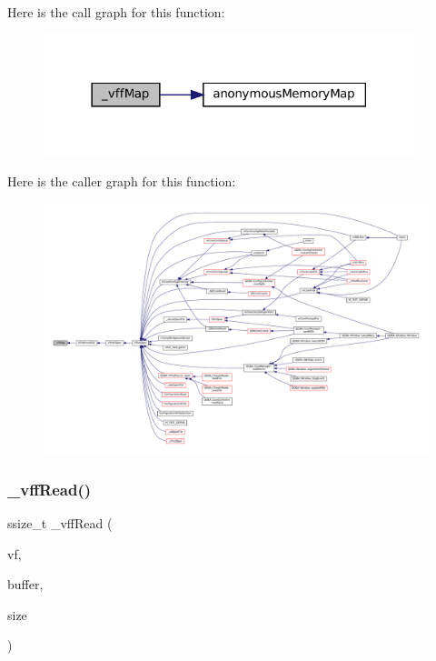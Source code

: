 Here is the call graph for this function\+:
\nopagebreak
\begin{figure}[H]
\begin{center}
\leavevmode
\includegraphics[width=306pt]{vfs-file_8c_ae264af80ce9f8d7e855924166bbe3866_cgraph}
\end{center}
\end{figure}
Here is the caller graph for this function\+:
\nopagebreak
\begin{figure}[H]
\begin{center}
\leavevmode
\includegraphics[width=350pt]{vfs-file_8c_ae264af80ce9f8d7e855924166bbe3866_icgraph}
\end{center}
\end{figure}
\mbox{\label{vfs-file_8c_a1d85f044bf97112d5d1ba2f57daba7d3}} 
\subsubsection{\texorpdfstring{\+\_\+vff\+Read()}{\_vffRead()}}
{\footnotesize\ttfamily ssize\+\_\+t \+\_\+vff\+Read (\begin{DoxyParamCaption}\item[{struct V\+File $\ast$}]{vf,  }\item[{void $\ast$}]{buffer,  }\item[{size\+\_\+t}]{size }\end{DoxyParamCaption})\hspace{0.3cm}{\ttfamily [static]}}

